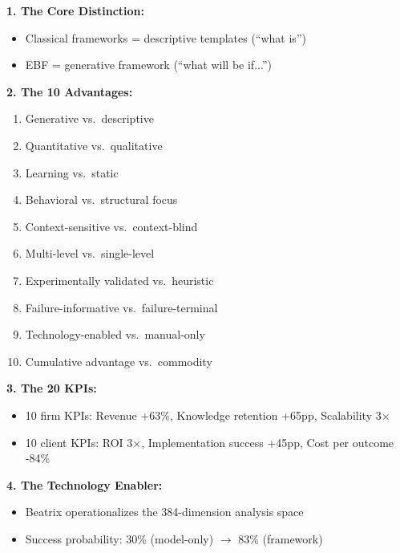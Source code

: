 \begin{tcolorbox}[colback=green!5!white, colframe=green!75!black,
    title=\textbf{DOMAIN-CONSULTING: Key Takeaways}]

\textbf{1. The Core Distinction:}
\begin{itemize}[nosep]
    \item Classical frameworks = descriptive templates (``what is'')
    \item EBF = generative framework (``what will be if...'')
\end{itemize}

\textbf{2. The 10 Advantages:}
\begin{enumerate}[nosep]
    \item Generative vs.\ descriptive
    \item Quantitative vs.\ qualitative
    \item Learning vs.\ static
    \item Behavioral vs.\ structural focus
    \item Context-sensitive vs.\ context-blind
    \item Multi-level vs.\ single-level
    \item Experimentally validated vs.\ heuristic
    \item Failure-informative vs.\ failure-terminal
    \item Technology-enabled vs.\ manual-only
    \item Cumulative advantage vs.\ commodity
\end{enumerate}

\textbf{3. The 20 KPIs:}
\begin{itemize}[nosep]
    \item 10 firm KPIs: Revenue +63\%, Knowledge retention +65pp, Scalability 3$\times$
    \item 10 client KPIs: ROI 3$\times$, Implementation success +45pp, Cost per outcome -84\%
\end{itemize}

\textbf{4. The Technology Enabler:}
\begin{itemize}[nosep]
    \item Beatrix operationalizes the 384-dimension analysis space
    \item Success probability: 30\% (model-only) $\rightarrow$ 83\% (framework)
\end{itemize}

\end{tcolorbox}

\begin{center}
\end{center}


